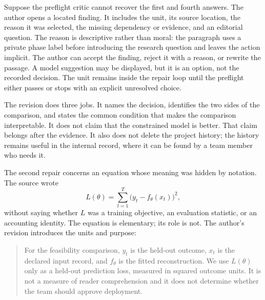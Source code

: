 Suppose the preflight critic cannot recover the first and fourth answers. The
author opens a located finding. It includes the unit, its source location, the
reason it was selected, the missing dependency or evidence, and an editorial
question. The reason is descriptive rather than moral: the paragraph uses a
private phase label before introducing the research question and leaves the
action implicit. The author can accept the finding, reject it with a reason, or
rewrite the passage. A model suggestion may be displayed, but it is an option,
not the recorded decision. The unit remains inside the repair loop until the
preflight either passes or stops with an explicit unresolved choice.

\begin{repairpair}
\end{repairpair}

The revision does three jobs. It names the decision, identifies the two sides
of the comparison, and states the common condition that makes the comparison
interpretable. It does not claim that the constrained model is better. That
claim belongs after the evidence. It also does not delete the project history;
the history remains useful in the internal record, where it can be found by a
team member who needs it.

The second repair concerns an equation whose meaning was hidden by notation.
The source wrote
\begin{equation}
  L(\theta) = \sum_{t=1}^{T}
  \bigl(y_t-f_\theta(x_t)\bigr)^2,
  \label{eq:case-source-loss}
\end{equation}
without saying whether $L$ was a training objective, an evaluation statistic,
or an accounting identity. The equation is elementary; its role is not. The
author's revision introduces the units and purpose:

\begin{quote}
For the feasibility comparison, $y_t$ is the held-out outcome, $x_t$ is the
declared input record, and $f_\theta$ is the fitted reconstruction. We use
$L(\theta)$ only as a held-out prediction loss, measured in squared outcome
units. It is not a measure of reader comprehension and it does not determine
whether the team should approve deployment.
\end{quote}


